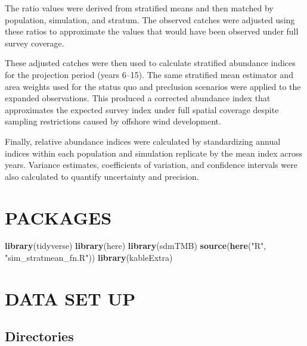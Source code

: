 \documentclass[
]{article}
\newenvironment{Shaded}{\begin{snugshade}}{\end{snugshade}}
\newcommand{\FunctionTok}[1]{\textcolor[rgb]{0.13,0.29,0.53}{\textbf{#1}}}
\newcommand{\NormalTok}[1]{#1}
\newcommand{\StringTok}[1]{\textcolor[rgb]{0.31,0.60,0.02}{#1}}
\begin{document}
The ratio values were derived from stratified means and then matched by
population, simulation, and stratum. The observed catches were adjusted
using these ratios to approximate the values that would have been
observed under full survey coverage.

These adjusted catches were then used to calculate stratified abundance
indices for the projection period (years 6--15). The same stratified
mean estimator and area weights used for the status quo and preclusion
scenarios were applied to the expanded observations. This produced a
corrected abundance index that approximates the expected survey index
under full spatial coverage despite sampling restrictions caused by
offshore wind development.

Finally, relative abundance indices were calculated by standardizing
annual indices within each population and simulation replicate by the
mean index across years. Variance estimates, coefficients of variation,
and confidence intervals were also calculated to quantify uncertainty
and precision.

\section{PACKAGES}\label{packages}

\begin{Shaded}
\begin{Highlighting}[]
\FunctionTok{library}\NormalTok{(tidyverse)}
\FunctionTok{library}\NormalTok{(here)}
\FunctionTok{library}\NormalTok{(sdmTMB)}
\FunctionTok{source}\NormalTok{(}\FunctionTok{here}\NormalTok{(}\StringTok{"R"}\NormalTok{, }\StringTok{"sim\_stratmean\_fn.R"}\NormalTok{))}
\FunctionTok{library}\NormalTok{(kableExtra)}
\end{Highlighting}
\end{Shaded}

\section{DATA SET UP}\label{data-set-up}

\subsection{Directories}\label{directories}
\end{document}
